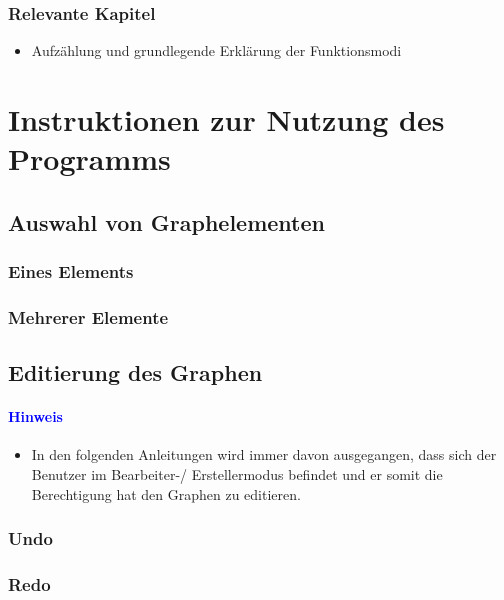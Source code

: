 \documentclass[enabledeprecatedfontcommands,fontsize=11pt,paper=a4,twoside]{scrartcl}
\newcommand*{\blue}{\textcolor{blue}}
\newcounter{one}
\begin{document}
\subsubsection{Relevante Kapitel}



\begin{itemize}
	\item Aufzählung und grundlegende Erklärung der Funktionsmodi
\end{itemize}



\newpage
\section{Instruktionen zur Nutzung des Programms} \label{sec:nutzung}
	\subsection{Auswahl von Graphelementen} \label{pick}
		\subsubsection{Eines Elements}
		\subsubsection{Mehrerer Elemente} 
	\subsection{Editierung des Graphen}\label{edit}
		\paragraph{\blue{Hinweis}}
		\begin{itemize}
			\item In den folgenden Anleitungen wird immer davon ausgegangen, dass sich der Benutzer im Bearbeiter-/ Erstellermodus befindet und er somit die Berechtigung hat den Graphen zu editieren.
		\end{itemize}
		\subsubsection{Undo}
		\subsubsection{Redo}
\end{document}
